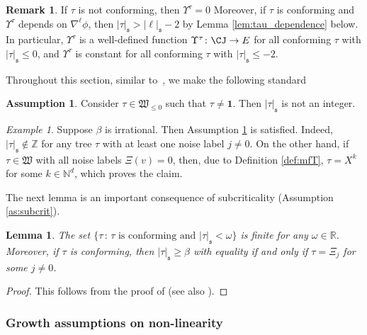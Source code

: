 \documentclass[11pt,a4paper]{article}
\numberwithin{equation}{section}
\newtheorem{lemma}[theorem]{Lemma}
\theoremstyle{definition}
\newtheorem{remark}[theorem]{Remark}
\newtheorem{assumption}[theorem]{Assumption}
\theoremstyle{remark}
\newtheorem{example}[theorem]{Example}
\def\R{{\mathbb R}}
\def\Z{{\mathbb Z}}
\def\N{{\mathbb N}}
\newcommand{\bone}{\mathbf{1}}
\newcommand{\s}{\mathfrak{s}}
\newcommand{\mfW}{\mathfrak{W}}
\begin{document}
\begin{remark}\label{rem:dependence}
If $\tau$ is not conforming, then $\Upsilon^\tau=0$
Moreover, if $\tau$ is conforming and $\Upsilon^\tau$ depends on $\nabla^\ell\phi$, then $|\tau|_\s >|\ell|_\s-2$
by Lemma \ref{lem:tau_dependence} below.
In particular, $\Upsilon^\tau$ is a well-defined function
$
\Upsilon^\tau \colon \CJ \to E
$
for all conforming $\tau$ with $|\tau|_\s\leq0$,
and $\Upsilon^\tau$ is constant for all conforming $\tau$ with $|\tau|_\s\leq -2$.
\end{remark}

Throughout this section, similar to~\cite[Assumption 5.3]{Hairer14}, we make the following standard

\begin{assumption}\label{as:non_integer}
Consider $\tau\in\mfW_{\leq 0}$ such that $\tau\neq\bone$.
Then $|\tau|_\s$ is not an integer.
\end{assumption}

\begin{example}
Suppose $\beta$ is irrational. Then Assumption \ref{as:non_integer} is satisfied.
Indeed, $|\tau|_\s\notin\Z$ for any tree $\tau$ with at least one noise label $j\neq0$.
On the other hand, if $\tau \in\mfW$ with all noise labels $\Xi(v)=0$, then, due to Definition \ref{def:mfT}, $\tau=X^k$ for some $k\in\N^d$, which proves the claim.
\end{example}

The next lemma is an important consequence of subcriticality (Assumption \ref{as:subcrit}).

\begin{lemma}\label{lem:lowest_tree}
The set $\{\tau\,:\,\tau \text{ is conforming and } |\tau|_\s <\omega\}$ is finite for any $\omega\in\R$.
Moreover, 
if $\tau$ is conforming, then
$|\tau|_\s \geq \beta$ with equality if and only if $\tau=\Xi_j$ for some $j\neq0$.
\end{lemma}

\begin{proof}
This follows from the proof of \cite[Lem.~8.10]{Hairer14} (see also \cite[Prop.~5.15]{BHZ19}).
\end{proof}


\subsubsection{Growth assumptions on non-linearity}
\end{document}
